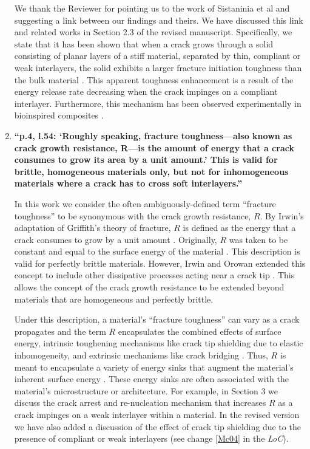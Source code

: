 \documentclass[11pt,letterpaper]{report}
\begin{document}
\begin{enumerate}[label=\textit{1.\arabic*},wide, labelwidth=!, labelindent=0pt]
We thank the Reviewer for pointing us to the work of Sistaninia et al and suggesting a link between our findings and theirs. We have discussed this link and related works in Section 2.3 of the revised manuscript. Specifically, we state that it has been shown that when a crack grows through a solid consisting of planar layers of a stiff material, separated by thin, compliant or weak interlayers, the solid exhibits a larger fracture initiation toughness than the bulk material \cite{fratzl2007hindered, kolednik2014improvements, kolednik2011bioinspired}. This apparent toughness enhancement is a result of the energy release rate decreasing when the crack impinges on a compliant interlayer. Furthermore, this mechanism has been observed experimentally in bioinspired composites \cite{zechner2013fracture, sistaninia2018design}.

\item \label{r1c7} {\bf ``p.4, l.54: `Roughly speaking, fracture toughness---also known as crack growth resistance, R---is the amount of energy that a crack consumes to grow its area by a unit amount.' This is valid for brittle, homogeneous materials only, but not for inhomogeneous materials where a crack has to cross soft interlayers.''}

In this work we consider the often ambiguously-defined term ``fracture toughness'' to be synonymous with the crack growth resistance, $R$. By Irwin's adaptation of Griffith's theory of fracture, $R$ is defined as the energy that a crack consumes to grow by a unit amount \cite{anderson2017fracture, lawn1993fracture}. Originally, $R$ was taken to be constant and equal to the surface energy of the material \cite{griffith1921phenomena}. This description is valid for perfectly brittle materials. However, Irwin and Orowan extended this concept to include other dissipative processes acting near a crack tip \cite{anderson2017fracture}. This allows the concept of the crack growth resistance to be extended beyond materials that are homogeneous and perfectly brittle.

Under this description, a material's ``fracture toughness'' can vary as a crack propagates and the term $R$ encapsulates the combined effects of surface energy, intrinsic toughening mechanisms like crack tip shielding due to elastic inhomogeneity, and extrinsic mechanisms like crack bridging \cite{evans1990perspective, lawn1993fracture}. Thus, $R$ is meant to encapsulate a variety of energy sinks that augment the material's inherent surface energy \cite{lawn1993fracture}. These energy sinks are often associated with the material's microstructure or architecture. For example, in Section 3 we discuss the crack arrest and re-nucleation mechanism that increases $R$ as a crack impinges on a weak interlayer within a material. In the revised version we have also added a discussion of the effect of crack tip shielding due to the presence of compliant or weak interlayers (see change \ref{Mc04} in the \textit{LoC}).


\end{enumerate}
\end{document}

